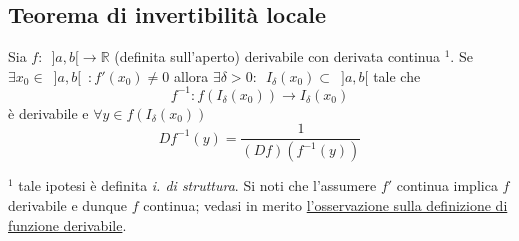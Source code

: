 \documentclass[10pt]{article}
\theoremstyle{plain}
\begin{document}
\subsection{Teorema di invertibilità locale}
\begin{ther}
Sia $f : \enspace ]a, b[ \rightarrow \mathbb{R}$ (definita sull'aperto) derivabile con derivata continua $^1$. Se $\exists x_0 \in \enspace ]a, b[ \enspace : f'(x_0) \neq 0$ allora $\exists \delta > 0 : \enspace I_\delta(x_0) \subset \enspace ]a, b[$ tale che
\[f^{-1} : f(I_\delta(x_0)) \rightarrow I_\delta(x_0)\] è derivabile e $\forall y \in f(I_\delta(x_0))$ \[D f^{-1}(y) = \frac{1}{(Df) (f^{-1}(y))}\]
\end{ther}
\textbf{$^1$} tale ipotesi è definita \textit{i. di struttura}. Si noti che l'assumere $f'$ continua implica $f$ derivabile e dunque $f$ continua; vedasi in merito \hyperref[subsubsec:derivabili]{l'osservazione sulla definizione di funzione derivabile}.
\end{document}
